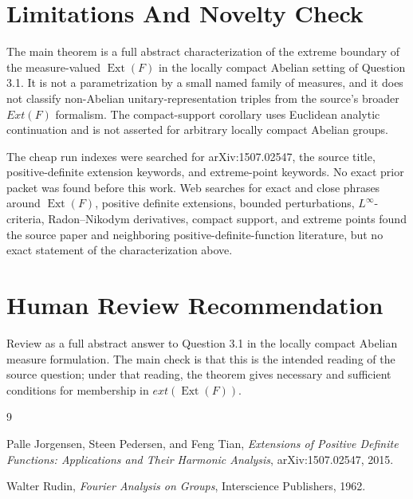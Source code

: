 \documentclass[11pt]{article}
\DeclareMathOperator{\Ext}{Ext}
\begin{document}
\section*{Limitations And Novelty Check}

The main theorem is a full abstract characterization of the extreme boundary of the measure-valued \(\Ext(F)\) in the locally compact Abelian setting of Question 3.1. It is not a parametrization by a small named family of measures, and it does not classify non-Abelian unitary-representation triples from the source's broader \(Ext(F)\) formalism. The compact-support corollary uses Euclidean analytic continuation and is not asserted for arbitrary locally compact Abelian groups.

The cheap run indexes were searched for arXiv:1507.02547, the source title, positive-definite extension keywords, and extreme-point keywords. No exact prior packet was found before this work. Web searches for exact and close phrases around \(\Ext(F)\), positive definite extensions, bounded perturbations, \(L^\infty\)-criteria, Radon--Nikodym derivatives, compact support, and extreme points found the source paper and neighboring positive-definite-function literature, but no exact statement of the characterization above.

\section*{Human Review Recommendation}

Review as a full abstract answer to Question 3.1 in the locally compact Abelian measure formulation. The main check is that this is the intended reading of the source question; under that reading, the theorem gives necessary and sufficient conditions for membership in \(ext(\Ext(F))\).

\begin{thebibliography}{9}

Palle Jorgensen, Steen Pedersen, and Feng Tian,
\emph{Extensions of Positive Definite Functions: Applications and Their Harmonic Analysis},
arXiv:1507.02547, 2015.

Walter Rudin,
\emph{Fourier Analysis on Groups},
Interscience Publishers, 1962.

\end{thebibliography}
\end{document}
